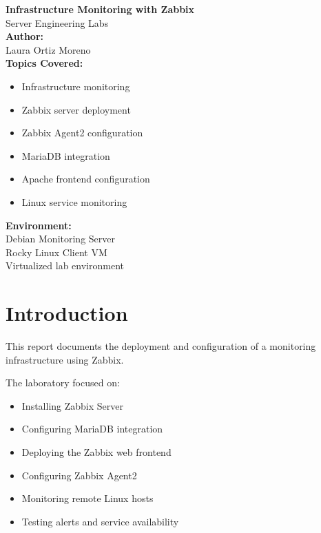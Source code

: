 \documentclass[11pt,a4paper]{article}
\begin{document}
\begin{titlepage}
    \centering

    \vspace*{3cm}

    {\Huge \textbf{Infrastructure Monitoring with Zabbix}}\\[1cm]

    {\Large Server Engineering Labs}\\[2cm]

    \textbf{Author:}\\
    Laura Ortiz Moreno\\[1cm]

    \textbf{Topics Covered:}
    \begin{itemize}[leftmargin=4cm]
        \item Infrastructure monitoring
        \item Zabbix server deployment
        \item Zabbix Agent2 configuration
        \item MariaDB integration
        \item Apache frontend configuration
        \item Linux service monitoring
    \end{itemize}

    \vfill

    \textbf{Environment:}\\
    Debian Monitoring Server\\
    Rocky Linux Client VM\\
    Virtualized lab environment

    \vspace{1cm}

\end{titlepage}

\tableofcontents
\newpage

\section{Introduction}

This report documents the deployment and configuration of a monitoring infrastructure using Zabbix.

The laboratory focused on:
\begin{itemize}
    \item Installing Zabbix Server
    \item Configuring MariaDB integration
    \item Deploying the Zabbix web frontend
    \item Configuring Zabbix Agent2
    \item Monitoring remote Linux hosts
    \item Testing alerts and service availability
\end{itemize}
\end{document}
